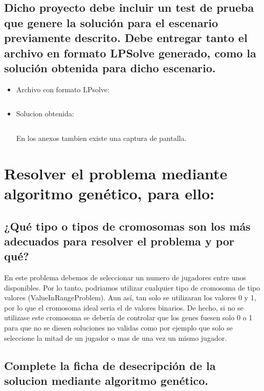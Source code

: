 \documentclass[a4paper,12pt]{article}
\begin{document}
\subsection{Dicho proyecto debe incluir un test de prueba que genere la solución para el escenario previamente descrito.
Debe entregar tanto el archivo en formato LPSolve generado, como la solución obtenida para dicho escenario.}

\begin{itemize}
  \item Archivo con formato LPsolve:
  \inputminted[fontsize=\footnotesize,breaklines]{text}{ficheros/ArchivoLPSolveGenerado.txt}
  \item Solucion obtenida:
  \inputminted[fontsize=\footnotesize,breaklines]{text}{ficheros/Solucion.txt}
  En los anexos tambien existe una captura de pantalla.

\end{itemize}




\section{Resolver el problema mediante algoritmo genético, para ello:}
\subsection{¿Qué tipo o tipos de cromosomas son los más adecuados para resolver el problema y por qué?}
En este problema debemos de seleccionar un numero de jugadores entre unos disponibles.
Por lo tanto, podriamos utilizar cualquier tipo de cromosoma de tipo valores (ValueInRangeProblem).
Aun así, tan solo se utilizaran los valores 0 y 1, por lo que el cromosoma ideal seria el de valores binarios.
De hecho, si no se utilizase este cromosoma se debería de controlar que los genes fuesen solo 0 o 1 para que no
se diesen soluciones no validas como por ejemplo que solo se seleccione la mitad de un jugador o mas de una vez un mismo jugador.
\subsection{Complete la ficha de desecripción de la solucion mediante algoritmo genético.}
\end{document}

